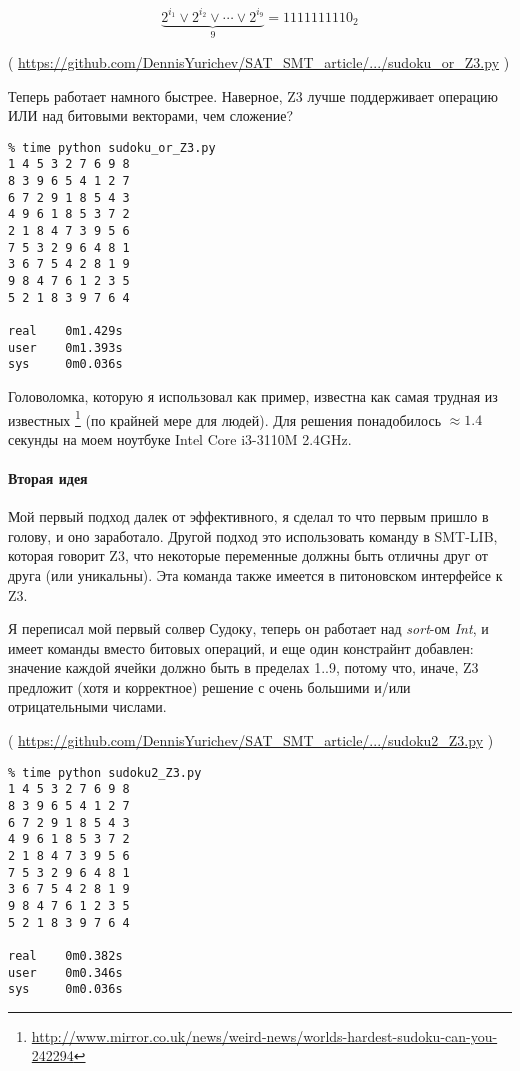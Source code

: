 \begin{equation}
\underbrace{2^{i_1} \vee 2^{i_2} \vee \cdots \vee 2^{i_9}}_9 = 1111111110_2
\end{equation}


( \url{https://github.com/DennisYurichev/SAT_SMT_article/.../sudoku_or_Z3.py} )

Теперь работает намного быстрее. Наверное, Z3 лучше поддерживает операцию ИЛИ над битовыми векторами, чем сложение?

\begin{lstlisting}
% time python sudoku_or_Z3.py
1 4 5 3 2 7 6 9 8
8 3 9 6 5 4 1 2 7
6 7 2 9 1 8 5 4 3
4 9 6 1 8 5 3 7 2
2 1 8 4 7 3 9 5 6
7 5 3 2 9 6 4 8 1
3 6 7 5 4 2 8 1 9
9 8 4 7 6 1 2 3 5
5 2 1 8 3 9 7 6 4

real    0m1.429s
user    0m1.393s
sys     0m0.036s
\end{lstlisting}

Головоломка, которую я использовал как пример, известна как самая трудная из известных
\footnote{\url{http://www.mirror.co.uk/news/weird-news/worlds-hardest-sudoku-can-you-242294}} (по крайней мере для людей).
Для решения понадобилось $\approx 1.4$ секунды на моем ноутбуке Intel Core i3-3110M 2.4GHz.

\paragraph{Вторая идея}

Мой первый подход далек от эффективного, я сделал то что первым пришло в голову, и оно заработало.
Другой подход это использовать команду  в SMT-LIB, которая говорит Z3, что некоторые переменные
должны быть отличны друг от друга (или уникальны).
Эта команда также имеется в питоновском интерфейсе к Z3.

Я переписал мой первый солвер Судоку, теперь он работает над \textit{sort}-ом 
\textit{Int}, и имеет команды  вместо битовых операций,
и еще один констрайнт добавлен: значение каждой ячейки должно быть в пределах 1..9, потому что, иначе, Z3 предложит
(хотя и корректное) решение с очень большими и/или отрицательными числами.


( \url{https://github.com/DennisYurichev/SAT_SMT_article/.../sudoku2_Z3.py} )

\begin{lstlisting}
% time python sudoku2_Z3.py
1 4 5 3 2 7 6 9 8
8 3 9 6 5 4 1 2 7
6 7 2 9 1 8 5 4 3
4 9 6 1 8 5 3 7 2
2 1 8 4 7 3 9 5 6
7 5 3 2 9 6 4 8 1
3 6 7 5 4 2 8 1 9
9 8 4 7 6 1 2 3 5
5 2 1 8 3 9 7 6 4

real    0m0.382s
user    0m0.346s
sys     0m0.036s
\end{lstlisting}

